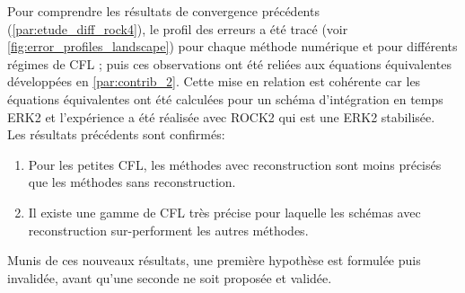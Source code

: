 \label{par:lien_rock_equiv}
Pour comprendre les résultats de convergence précédents (\ref{par:etude_diff_rock4}), le profil des erreurs a été tracé (voir \ref{fig:error_profiles_landscape}) pour chaque méthode numérique et pour différents régimes de CFL ; puis 
ces observations ont été reliées aux équations équivalentes développées en \ref{par:contrib_2}. 
Cette mise en relation est cohérente car les équations équivalentes ont été calculées pour un schéma d'intégration en temps ERK2 et l'expérience a été réalisée avec 
ROCK2 qui est une ERK2 stabilisée.\\
Les résultats précédents sont confirmés:
\begin{enumerate}
    \item Pour les petites CFL, les méthodes avec reconstruction sont moins précisés que les méthodes sans reconstruction.
    \item Il existe une gamme de CFL très précise pour laquelle les schémas avec reconstruction sur-performent les autres méthodes.
\end{enumerate}
Munis de ces nouveaux résultats, une première hypothèse est formulée puis invalidée, avant qu'une seconde ne soit proposée et validée.
